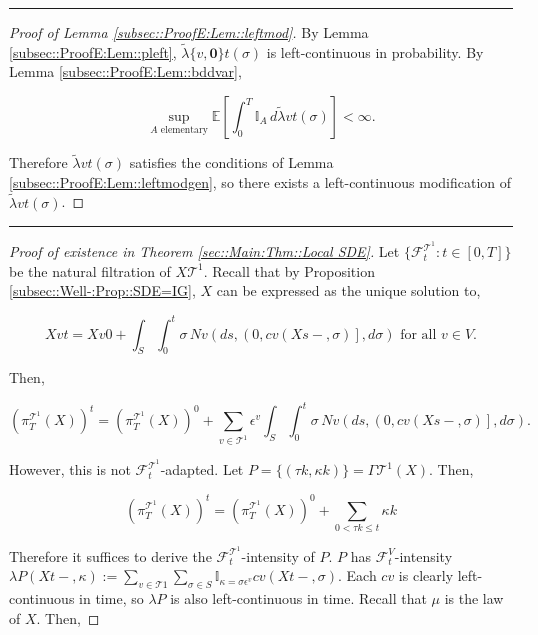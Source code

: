 \documentclass[12pt]{article}
\newcommand{\mb}{\mathbb}
\newcommand{\mc}{\mathcal}
\newcommand{\te}{\text}
\newcommand{\ep}{\epsilon}
\newcommand{\lin}{\rule{\linewidth}{0.4 pt}}
\newcommand{\ex}[1]{\mb{E}\left[#1\right]}			%
\renewcommand{\root}{\mathbf{0}}				%
\renewcommand{\v}{v}							%
\renewcommand{\S}{S}							%
\newcommand{\s}{\sigma}							%
\newcommand{\ev}{\ep}							%
\newcommand{\T}{T}								%
\renewcommand{\t}{t}							%
\newcommand{\proj}{\pi}							%
\renewcommand{\tt}{s}							%
\newcommand{\F}{\mc{F}}							%
\newcommand{\X}{X}								%
\newcommand{\IGr}{c}							%
\newcommand{\vind}[1]{^{#1}}					%
\newcommand{\vsi}[1]{^{#1}}						%
\newcommand{\ts}[1]{_{#1}}						%
\newcommand{\tree}{\mc{T}}						%
\newcommand{\sln}[1]{^{#1}}						%
\newcommand{\poiss}{N}							%
\newcommand{\rate}{\lambda}						%
\newcommand{\alt}[1]{\widetilde{#1}}			%
\newcommand{\m}{\mu}							%
\newcommand{\rt}{\tau}							%
\renewcommand{\it}{k}							%
\newcommand{\pmap}{\Gamma}						%
\renewcommand{\mark}{\kappa}					%
\newcommand{\rp}{P}								%
\newcommand{\typset}{A}							%
\newcommand{\crate}{\alt{\lambda}}				%
\begin{document}
\lin

\begin{proof}[Proof of Lemma \ref{subsec::ProofE:Lem::leftmod}]

By Lemma \ref{subsec::ProofE:Lem::pleft}, \(\crate{\{\v,\root\}}{\t}(\s)\) is left-continuous in probability. By Lemma \ref{subsec::ProofE:Lem::bddvar},

\[\sup_{\typset\te{ elementary}} \ex{\int_0^\T \mb{I}_{\typset}\,d\crate{\v}{\t}(\s)} < \infty.\]

Therefore \(\crate{\v}{\t}(\s)\) satisfies the conditions of Lemma \ref{subsec::ProofE:Lem::leftmodgen}, so there exists a left-continuous modification of \(\crate{\v}{\t}(\s)\).
\end{proof}

\lin

\begin{proof}[Proof of existence in Theorem \ref{sec::Main:Thm::Local SDE}]

Let \(\{\F\vsi{\tree\sln{1}}\ts{\t}:\t\in [0,\T]\}\) be the natural filtration of \(\X{\tree\sln{1}}{}\). Recall that by Proposition \ref{subsec::Well-:Prop::SDE=IG}, \(\X{}{}\) can be expressed as the unique solution to,

\[\X{\v}{\t} = \X{\v}{0} + \int_\S\int_0^\t \s\,\poiss{\v}\left(d\tt,\left(0,c{\v}(\X{}{\tt-},\s)\right],d\s\right) \te{ for all } \v \in V.\]

Then,

\[\left(\proj\vsi{\tree\sln{1}}\ts{\T}(\X{}{})\right)^\t = \left(\proj\vsi{\tree\sln{1}}\ts{\T}(\X{}{})\right)^0 + \sum_{\v \in \tree\sln{1}}\ev\vind{\v}\int_\S\int_0^\t \s\,\poiss{\v}\left(d\tt,\left(0,\IGr{\v}(\X{}{\tt-},\s)\right],d\s\right).\]

However, this is not \(\F\vsi{\tree\sln{1}}\ts{\t}\)-adapted. Let \(\rp{} = \{(\rt{\it},\mark{\it})\} = \pmap{\tree\sln{1}}(\X{}{}).\) Then,

\[\left(\proj\vsi{\tree\sln{1}}\ts{\T}(\X{}{})\right)^\t = \left(\proj\vsi{\tree\sln{1}}\ts{\T}(\X{}{})\right)^0 + \sum_{0 < \rt{\it} \leq \t}\mark{\it}\]

Therefore it suffices to derive the \(\F\vsi{\tree\sln{1}}\ts{\t}\)-intensity of \(\rp{}\). \(\rp{}\) has \(\F\vsi{V}\ts{\t}\)-intensity \(\rate{\rp{}}(\X{}{\t-},\mark{}) := \sum_{\v \in \tree{1}}\sum_{\s\in \S}\mb{I}_{\mark{} = \s\ev\vind{\v}}\IGr{\v}(\X{}{\t-},\s)\). Each \(\IGr{\v}\) is clearly left-continuous in time, so \(\rate{\rp{}}\) is also left-continuous in time. Recall that \(\m{}{}{}\) is the law of \(\X{}{}\). Then,


\end{proof}
\end{document}
